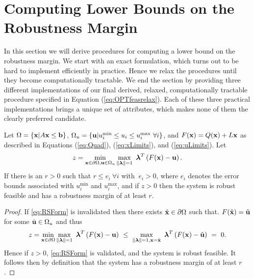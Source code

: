 \section{Computing Lower Bounds on the Robustness Margin} \label{sec:inbdform}

In this section we will derive procedures for computing a lower bound on the robustness margin. 
We start with an exact formulation, which turns out to be hard to implement efficiently in practice.
Hence we relax the procedures until they become computationally tractable. 
We end the section by providing three different implementations of our final derived, relaxed, computationally tractable procedure specified in Equation (\ref{eq:OPTfeasrelax}).
Each of these three practical implementations brings a unique set of attributes, which makes none of them the clearly preferred candidate.

\smallskip
\begin{thm}
  Let $\Omega=\{\mathbf{x}| A\mathbf{x} \leq \mathbf{b}\}$, $\Omega_{u}=\{\mathbf{u}| u^{\min}_i\leq u_i \leq u^{\max}_i \ \forall i \}$, and $F(\mathbf{x})=Q(\mathbf{x})+L\mathbf{x}$ as described in Equations (\ref{eq:Quad}), (\ref{eq:xLimits}), and (\ref{eq:uLimits}). 
  Let
  \[
  z = \min\limits_{\vx\in \partial \Omega, \vu\in \Omega_{u} }\max\limits_{\norm{\vlambda}=1}\ \vlambda^T\left(F(\vx)-\vu\right).
  \]
  If there is an $r>0$ such that $r \leq e_i \ \forall i$ with $\ e_i>0$, where $e_i$ denotes the error bounds associated with $ u^{\min}_i$ and $ u^{\max}_i$, and if $z > 0$ then the system is robust feasible and has a robustness margin of at least $r$.

  \medskip
  \begin{proof} 
    If \cref{eq:RSForm} is invalidated then there exists $\hat{\mathbf{x}} \in \partial\Omega$ such that. $F(\hat{\mathbf{x}})=\hat{\mathbf{u}}$ for some $\hat{\mathbf{u}}\in\Omega_{u}$ and thus
    \[
    z = \min\limits_{\vx\in \partial \Omega}\max\limits_{\norm{\vlambda}=1}\ \vlambda^T\left(F(\vx)-\vu\right) ~\leq~ \max\limits_{\norm{\vlambda}=1, \vx=\hat{\vx}}\ \vlambda^T\left(F(\vx)-\hat{\vu}\right) ~=~ 0.
    \]
    Hence if $z>0$, \cref{eq:RSForm} is validated, and the system is robust feasible.
    It follows then by definition that the system has a robustness margin of at least $r$.
  \end{proof}
\end{thm}

